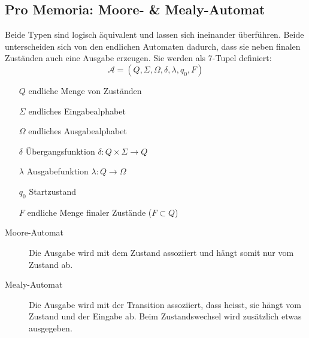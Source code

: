 \subsection{Pro Memoria: Moore- \&  Mealy-Automat}
Beide Typen sind logisch äquivalent und lassen sich ineinander überführen. Beide unterscheiden sich von den endlichen Automaten dadurch, dass sie neben finalen Zuständen auch eine Ausgabe erzeugen.
Sie werden als 7-Tupel definiert:
\begin{equation*}
	\mathcal{A} = ( Q, \Sigma, \Omega, \delta, \lambda, q_0, F )	
\end{equation*}
\begin{itemize}\itemsep0em
		\item [$Q$] endliche Menge von Zuständen
		\item [$\Sigma$] endliches Eingabealphabet
		\item [$\Omega$] endliches Ausgabealphabet
		\item [$\delta$] Übergangsfunktion $\delta : Q \times \Sigma \rightarrow Q$
		\item [$\lambda$] Ausgabefunktion $\lambda : Q \rightarrow \Omega$
		\item [$q_0$] Startzustand
		\item [$F$] endliche Menge finaler Zustände ($F \subset Q$)
\end{itemize}


\begin{description}
	\item [Moore-Automat] 
	Die Ausgabe wird mit dem Zustand assoziiert und hängt somit nur vom Zustand ab.	

	\item [Mealy-Automat] 
	Die Ausgabe wird mit der Transition assoziiert, dass heisst, sie hängt vom Zustand und der Eingabe ab. Beim Zustandswechsel wird zusätzlich etwas ausgegeben.

\end{description}
